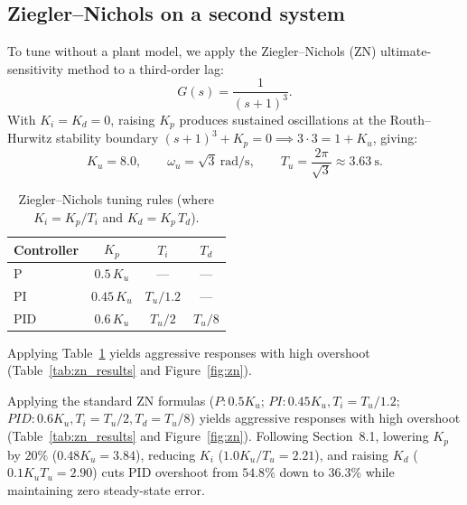 \documentclass[10pt]{article}
\begin{document}
	\subsection{Ziegler--Nichols on a second system}
	To tune without a plant model, we apply the Ziegler--Nichols (ZN) ultimate-sensitivity method to a third-order lag:
	\begin{equation}
		G(s) = \frac{1}{(s+1)^3}.
	\end{equation}
	With $K_i = K_d = 0$, raising $K_p$ produces sustained oscillations at the Routh--Hurwitz stability boundary $(s+1)^3 + K_p = 0 \implies 3 \cdot 3 = 1 + K_u$, giving:
	\begin{equation}
		K_u = 8.0, \qquad \omega_u = \sqrt{3}\ \text{rad/s}, \qquad T_u = \frac{2\pi}{\sqrt{3}} \approx 3.63\ \text{s}.
	\end{equation}
	
	\begin{table}[h]
		\centering
		\small
		\begin{tabular}{@{}lccc@{}}
			\toprule
			Controller & $K_p$ & $T_i$ & $T_d$ \\
			\midrule
			P   & $0.5\,K_u$  & ---       & --- \\
			PI  & $0.45\,K_u$ & $T_u/1.2$ & --- \\
			PID & $0.6\,K_u$  & $T_u/2$   & $T_u/8$ \\
			\bottomrule
		\end{tabular}
		\caption{Ziegler--Nichols tuning rules (where $K_i = K_p/T_i$ and $K_d = K_p\,T_d$).}
		\label{tab:zn_recipe}
	\end{table}
	
	Applying Table~\ref{tab:zn_recipe} yields aggressive responses with high overshoot (Table~\ref{tab:zn_results} and Figure~\ref{fig:zn}).
	
	Applying the standard ZN formulas ($P: 0.5K_u$; $PI: 0.45K_u, T_i=T_u/1.2$; $PID: 0.6K_u, T_i=T_u/2, T_d=T_u/8$) yields aggressive responses with high overshoot (Table~\ref{tab:zn_results} and Figure~\ref{fig:zn}). Following Section~8.1, lowering $K_p$ by $20\%$ ($0.48K_u = 3.84$), reducing $K_i$ ($1.0K_u/T_u = 2.21$), and raising $K_d$ ($0.1K_u T_u = 2.90$) cuts PID overshoot from $54.8\%$ down to $36.3\%$ while maintaining zero steady-state error.
	
\end{document}
